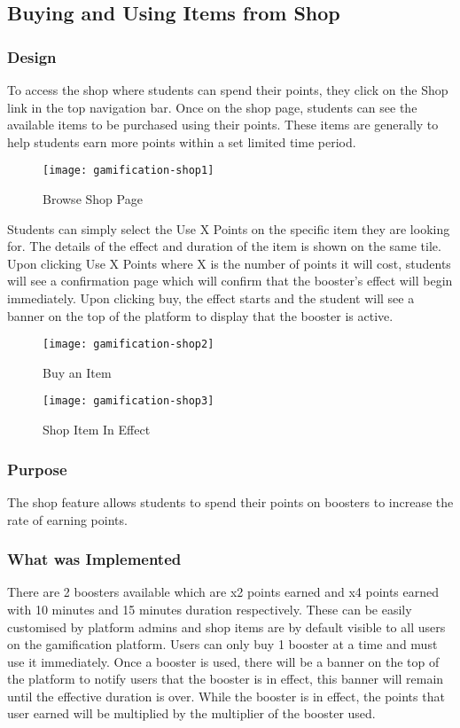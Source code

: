 \newpage

\subsection{Buying and Using Items from Shop}
\subsubsection{Design}
To access the shop where students can spend their points, they click on the Shop link in the top navigation bar. Once on the shop page, students can see the available items to be purchased using their points. These items are generally to help students earn more points within a set limited time period.

\begin{figure}[h!]
    \texttt{[image: gamification-shop1]}
    \centering
    \caption{Browse Shop Page}
\end{figure}

Students can simply select the Use X Points on the specific item they are looking for. The details of the effect and duration of the item is shown on the same tile. Upon clicking Use X Points where X is the number of points it will cost, students will see a confirmation page which will confirm that the booster’s effect will begin immediately. Upon clicking buy, the effect starts and the student will see a banner on the top of the platform to display that the booster is active.

\newpage 

\begin{figure}[h!]
    \texttt{[image: gamification-shop2]}
    \centering
    \caption{Buy an Item}
\end{figure}

\begin{figure}[h!]
    \texttt{[image: gamification-shop3]}
    \centering
    \caption{Shop Item In Effect}
\end{figure}

\newpage

\subsubsection{Purpose}
The shop feature allows students to spend their points on boosters to increase the rate of earning points.

\subsubsection{What was Implemented}
There are 2 boosters available which are x2 points earned and x4 points earned with 10 minutes and 15 minutes duration respectively. These can be easily customised by platform admins and shop items are by default visible to all users on the gamification platform. Users can only buy 1 booster at a time and must use it immediately. Once a booster is used, there will be a banner on the top of the platform to notify users that the booster is in effect, this banner will remain until the effective duration is over. While the booster is in effect, the points that user earned will be multiplied by the multiplier of the booster used.


